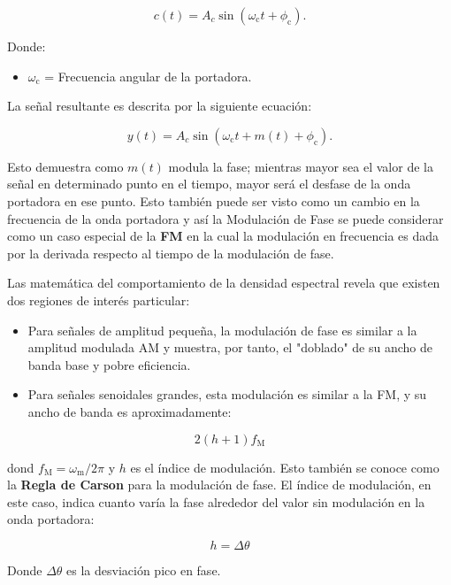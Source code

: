 \documentclass[a4paper]{article}
\begin{document}
\[c(t) = A_c\sin\left(\omega_\mathrm{c}t + \phi_\mathrm{c}\right).\]

Donde:
\begin{itemize}
	\item $\scriptstyle \omega_\mathrm{c}$ = Frecuencia angular de la portadora.
\end{itemize}

La señal resultante es descrita por la siguiente ecuación:

\[y(t) = A_c\sin\left(\omega_\mathrm{c}t + m(t) + \phi_\mathrm{c}\right).\]

Esto demuestra como $\scriptstyle m(t)$ modula la fase; mientras mayor sea el valor de la señal en determinado punto en el tiempo, mayor será el desfase de la onda portadora en ese punto. Esto también puede ser visto como un cambio en la frecuencia de la onda portadora y así la Modulación de Fase se puede considerar como un caso especial de la \textbf{FM} en la cual la modulación en frecuencia es dada por la derivada respecto al tiempo de la modulación de fase.

Las matemática del comportamiento de la densidad espectral revela que existen dos regiones de interés particular: 

\begin{itemize}
	\item Para señales de amplitud pequeña, la modulación de fase es similar a la amplitud modulada AM y muestra, por tanto, el "doblado" de su ancho de banda base y pobre eficiencia.

	\item Para señales senoidales grandes, esta modulación es similar a la FM, y su ancho de banda es aproximadamente:
\end{itemize}

\[2\left(h + 1\right)f_\mathrm{M}\]

dond $\textstyle f_\mathrm{M} = \omega_\mathrm{m}/2\pi$ y $\textstyle h$ es el índice de modulación. Esto también se conoce como la \textbf{Regla de Carson} para la modulación de fase. El índice de modulación, en este caso, indica cuanto varía la fase alrededor del valor sin modulación en la onda portadora:

\[h= \Delta \theta\]

Donde $\scriptstyle \Delta \theta$ es la desviación pico en fase.
\end{document}
